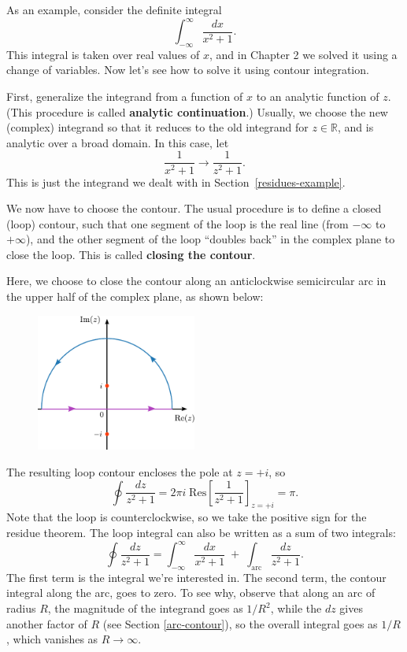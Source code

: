 \documentclass[10pt,a4paper]{article}
\begin{document}
As an example, consider the definite integral
\begin{equation}
\int_{-\infty}^\infty \frac{dx}{x^2 + 1}.
\end{equation}
This integral is taken over real values of $x$, and in Chapter 2 we
solved it using a change of variables. Now let's see how to solve it
using contour integration.

First, generalize the integrand from a function of $x$ to an analytic
function of $z$. (This procedure is called \textbf{analytic
  continuation}.) Usually, we choose the new (complex) integrand so
that it reduces to the old integrand for $z \in \mathbb{R}$, and is
analytic over a broad domain. In this case, let
\begin{equation}
\frac{1}{x^2 + 1} \rightarrow \frac{1}{z^2 + 1}.
\end{equation}
This is just the integrand we dealt with in
Section~\ref{residues-example}.

We now have to choose the contour. The usual procedure is to define a
closed (loop) contour, such that one segment of the loop is the real
line (from $-\infty$ to $+\infty$), and the other segment of the loop
``doubles back'' in the complex plane to close the loop. This is
called \textbf{closing the contour}.

Here, we choose to close the contour along an anticlockwise semicircular
arc in the upper half of the complex plane, as shown below:

\begin{figure}[ht]
  \centering\includegraphics[width=0.47\textwidth]{closing_contour}
\end{figure}

The resulting loop contour encloses the pole at $z = +i$, so
\begin{equation}
\oint \frac{dz}{z^2+1} = 2\pi i \; \mathrm{Res}\left[\frac{1}{z^2 + 1}\right]_{z = +i} = \pi.
\end{equation}
Note that the loop is counterclockwise, so we take the positive sign for
the residue theorem. The loop integral can also be written as a sum of
two integrals:
\begin{equation}
\oint \frac{dz}{z^2 + 1} = \int_{-\infty}^\infty \frac{dx}{x^2 + 1} \;+\; \int_{\mathrm{arc}} \frac{dz}{z^2 + 1}.
\end{equation}
The first term is the integral we're interested in. The second term,
the contour integral along the arc, goes to zero. To see why, observe
that along an arc of radius $R$, the magnitude of the integrand goes
as $1/R^{2}$, while the $dz$ gives another factor of $R$ (see Section
\ref{arc-contour}), so the overall integral goes as $1/R$, which
vanishes as $R \rightarrow \infty$.
\end{document}
